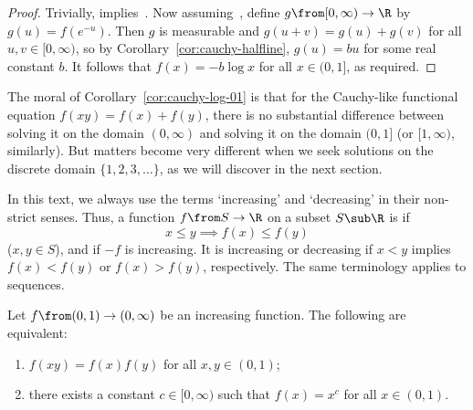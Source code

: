 \begin{proof}
Trivially, 
implies~.  Now
assuming~, define $g \from [0, \infty) \to
\R$ by $g(u) = f(e^{-u})$.  Then $g$ is measurable and $g(u + v) = g(u) +
g(v)$ for all $u, v \in [0, \infty)$, so by
Corollary~\ref{cor:cauchy-halfline}, $g(u) = bu$ for some real constant
$b$.  It follows that $f(x) = -b\log x$ for all $x \in (0, 1]$, as
required.
\end{proof}

The moral of Corollary~\ref{cor:cauchy-log-01} is that for the Cauchy-like
functional equation $f(xy) = f(x) + f(y)$, there is no substantial
difference between solving it on the domain $(0, \infty)$ and solving it on
the domain $(0, 1]$ (or $[1, \infty)$, similarly).  But matters become very
different when we seek solutions on the discrete domain $\{1, 2, 3,
\ldots\}$, as we will discover in the next section.

\begin{remark}
In this text, we always use the terms `increasing' and `decreasing' in
their non-strict senses.  Thus, a function $f \from S \to \R$ on a subset
$S \sub \R$ is %
%
% 
if
\[
x \leq y \implies f(x) \leq f(y)
\]
($x, y \in S$), and  if $-f$ is
increasing.  It is %
%
%
% 
increasing or decreasing%
%
% 
if $x < y$ implies $f(x) < f(y)$
or $f(x) > f(y)$, respectively.  The same terminology applies to
sequences.%
%
\end{remark}

\begin{cor}
Let $f \from (0, 1) \to (0, \infty)$ be an increasing function.  The
following are equivalent:
% 
\begin{enumerate}
\item
{}
$f(xy) = f(x)f(y)$ for all $x, y \in (0, 1)$;

\item
{}
there exists a constant $c \in [0, \infty)$ such that $f(x) = x^c$ for all
  $x \in (0, 1)$.
\end{enumerate}
\end{cor}

